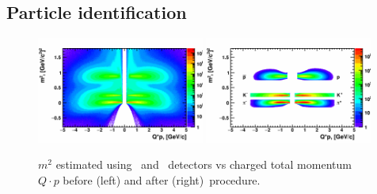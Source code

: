 \FloatBarrier
\subsection {Particle identification}

\begin{figure}[ht]
    \begin{multicols}{2}
        \hfill
        \includegraphics[width=0.49\textwidth]{Figures/M2Qp_before_PID.png}
        \hfill
        \includegraphics[width=0.49\textwidth]{Figures/M2Qp_after_PID.png}
    \end{multicols}
    \label{fig:M2vsQp}
    \caption{$m^2$ estimated using \TPC\ and \TOF\ detectors vs charged total momentum $Q\cdot p$ before (left) and after (right)\PID\ procedure.}
\end{figure}